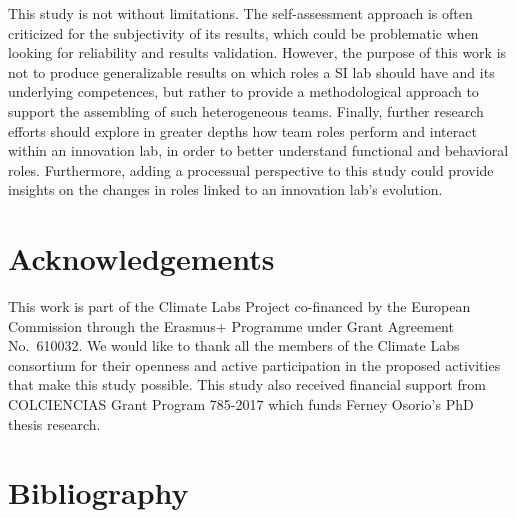 \documentclass[AMA,STIX1COL,APA,STIX2COL]{WileyNJD-v2}
\begin{document}
This study is not without limitations. The self-assessment approach is
often criticized for the subjectivity of its results, which could be
problematic when looking for reliability and results validation.
However, the purpose of this work is not to produce generalizable
results on which roles a SI lab should have and its underlying
competences, but rather to provide a methodological approach to support
the assembling of such heterogeneous teams. Finally, further research
efforts should explore in greater depths how team roles perform and
interact within an innovation lab, in order to better understand
functional and behavioral roles. Furthermore, adding a processual
perspective to this study could provide insights on the changes in roles
linked to an innovation lab's evolution.

\hypertarget{acknowledgements}{%
\section{Acknowledgements}\label{acknowledgements}}

This work is part of the Climate Labs Project co-financed by the
European Commission through the Erasmus+ Programme under Grant Agreement
No.~610032. We would like to thank all the members of the Climate Labs
consortium for their openness and active participation in the proposed
activities that make this study possible. This study also received
financial support from COLCIENCIAS Grant Program 785-2017 which funds
Ferney Osorio's PhD thesis research.

\newpage

\hypertarget{bibliography}{%
\section*{Bibliography}\label{bibliography}}
\end{document}
